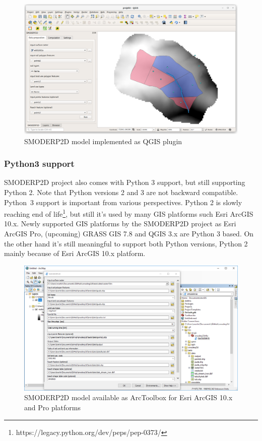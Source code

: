 \begin{figure}[ht!]
  \begin{center}
    \includegraphics[width=1.0\columnwidth]{figures/smoderp2d_qgis.png}
    \caption{SMODERP2D model implemented as QGIS plugin}
    \label{fig:smoderp2_qgis}
  \end{center}
\end{figure}

\subsubsection{Python3 support}
SMODERP2D project also comes with Python 3 support, but still
supporting Python 2. Note that Python versions 2 and 3 are not
backward compatible.  Python~3 support is important from various
perspectives. Python 2 is slowly reaching end of
life\footnote{https://legacy.python.org/dev/peps/pep-0373/}, but still
it’s used by many GIS platforms such Esri ArcGIS 10.x. Newly supported
GIS platforms by the SMODERP2D project as Esri ArcGIS Pro, (upcoming)
GRASS GIS 7.8 and QGIS 3.x are Python 3 based. On the other hand it’s
still meaningful to support both Python versions, Python 2 mainly
because of Esri ArcGIS 10.x platform.

\begin{figure}[ht!]
  \begin{center}
    \includegraphics[width=1.0\columnwidth]{figures/smoderp2d_arcgis.png}
    \caption{SMODERP2D model available as ArcToolbox for Esri ArcGIS
      10.x and Pro platforms}
    \label{fig:smoderp2d_arcgis}
  \end{center}
\end{figure}
